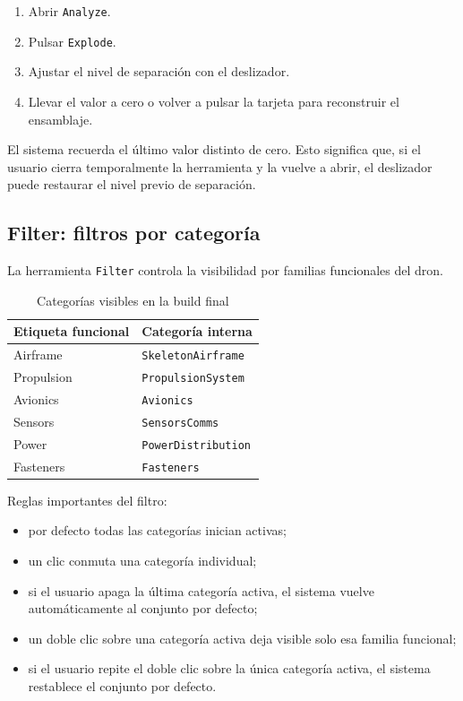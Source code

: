 \documentclass[12pt,letterpaper]{article}
\begin{document}
\begin{enumerate}
    \item Abrir \texttt{Analyze}.
    \item Pulsar \texttt{Explode}.
    \item Ajustar el nivel de separación con el deslizador.
    \item Llevar el valor a cero o volver a pulsar la tarjeta para reconstruir el ensamblaje.
\end{enumerate}

\noindent El sistema recuerda el último valor distinto de cero. Esto significa que, si el usuario cierra temporalmente la herramienta y la vuelve a abrir, el deslizador puede restaurar el nivel previo de separación.

\subsection{Filter: filtros por categoría}
La herramienta \texttt{Filter} controla la visibilidad por familias funcionales del dron.

\begin{table}[htbp!]
\centering
\caption{Categorías visibles en la build final}
\begin{tabular}{p{5cm}p{7cm}}
\toprule
\textbf{Etiqueta funcional} & \textbf{Categoría interna} \\
\midrule
Airframe & \texttt{SkeletonAirframe} \\
Propulsion & \texttt{PropulsionSystem} \\
Avionics & \texttt{Avionics} \\
Sensors & \texttt{SensorsComms} \\
Power & \texttt{PowerDistribution} \\
Fasteners & \texttt{Fasteners} \\
\bottomrule
\end{tabular}
\end{table}

\noindent Reglas importantes del filtro:
\begin{itemize}
    \item por defecto todas las categorías inician activas;
    \item un clic conmuta una categoría individual;
    \item si el usuario apaga la última categoría activa, el sistema vuelve automáticamente al conjunto por defecto;
    \item un doble clic sobre una categoría activa deja visible solo esa familia funcional;
    \item si el usuario repite el doble clic sobre la única categoría activa, el sistema restablece el conjunto por defecto.
\end{itemize}
\end{document}
